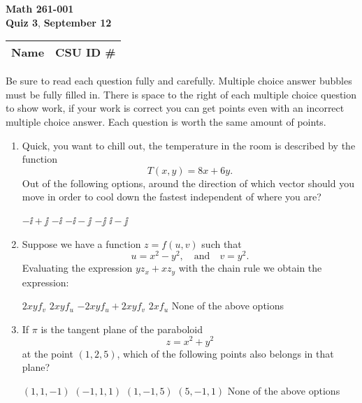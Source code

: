 \documentclass[12pt]{exam}
\newcommand{\class}{Math 261-001} %
\newcommand{\examnum}{Quiz 3} %
\newcommand{\examdate}{September 12} %
\begin{document}
\pagestyle{plain}
\thispagestyle{empty}

\noindent
\textbf{\class}\\
\textbf{\examnum}, \textbf{\examdate} \\



\setlength{\tabcolsep}{3.5cm} %
\renewcommand{\arraystretch}{1.5}
\setlength\extrarowheight{1cm}
\begin{tabular}{ |c|c| } 
 \hline
 Name   & CSU ID \#  \\ 
 \hline
\end{tabular}
\vspace{10pt}

Be sure to read each question fully and carefully. Multiple choice answer bubbles must be fully filled in.  There is space to the right of each multiple choice question to show work, if your work is correct you can get points even with an incorrect multiple choice answer.  Each question is worth the same amount of points.


\iffalse

    \foreach \s in {1,...,5}{
          \choice $P_\s$ has no power 
     }%
\fi


\begin{enumerate} 

\item Quick, you want to chill out, the temperature in the room is described by the function
$$T(x,y)=8x+6y.$$
Out of the following options, around the direction of which vector should you move in order to cool down the fastest independent of where you are?
    \begin{checkboxes}
        \choice $-\ii+\jj$
        \choice $-\ii$
        \choice $-\ii-\jj$
        \choice $-\jj$
        \choice $\ii-\jj$
    \end{checkboxes}
    \vfill
    
\item Suppose we have a function $z=f(u,v)$ such that 
$$u=x^2-y^2,\quad\text{and}\quad v=y^2.$$
Evaluating the expression $yz_x+xz_y$ with the chain rule we obtain the expression:
\begin{checkboxes}
        \choice $2xyf_v$
        \choice $2xyf_u$
        \choice $-2xyf_u+2xyf_v$
        \choice $2xf_u$
        \choice None of the above options
    \end{checkboxes}

\item If $\pi$ is the tangent plane of the paraboloid
$$z=x^2+y^2$$
at the point $(1,2,5)$, which of the following points also belongs in that plane?
\begin{checkboxes}
        \choice $(1,1,-1)$
        \choice $(-1,1,1)$
        \choice $(1,-1,5)$
        \choice $(5,-1,1)$
        \choice None of the above options
    \end{checkboxes}
\end{enumerate}
\end{document}

